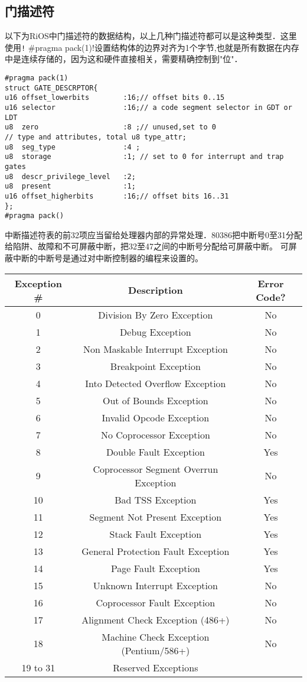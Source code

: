 \subsection{门描述符}
以下为RiOS中门描述符的数据结构，以上几种门描述符都可以是这种类型．这里使用\texttt!
#pragma pack(1)!设置结构体的边界对齐为1个字节,也就是所有数据在内存中是连续存储的，因为这和硬件直接相关，需要精确控制到"位"．
\begin{verbatim}
#pragma pack(1)
struct GATE_DESCRPTOR{
u16 offset_lowerbits        :16;// offset bits 0..15
u16 selector                :16;// a code segment selector in GDT or LDT
u8  zero                    :8 ;// unused,set to 0
// type and attributes, total u8 type_attr;
u8  seg_type                :4 ;
u8  storage                 :1; // set to 0 for interrupt and trap gates 
u8  descr_privilege_level   :2;
u8  present                 :1;
u16 offset_higherbits       :16;// offset bits 16..31	
};
#pragma pack()
\end{verbatim}

中断描述符表的前32项应当留给处理器内部的异常处理．80386把中断号0至31分配
给陷阱、故障和不可屏蔽中断，把32至47之间的中断号分配给可屏蔽中断。
可屏蔽中断的中断号是通过对中断控制器的编程来设置的。

\begin{tabular}{|c|c|c|}%
    \toprule
    Exception \# & Description & Error Code?\tabularnewline
    \midrule
    0 & Division By Zero Exception & No\tabularnewline
    1 & Debug Exception & No\tabularnewline
    2 & Non Maskable Interrupt Exception & No\tabularnewline
    3 & Breakpoint Exception & No\tabularnewline
    4 & Into Detected Overflow Exception & No\tabularnewline
    5 & Out of Bounds Exception & No\tabularnewline
    6 & Invalid Opcode Exception & No\tabularnewline
    7 & No Coprocessor Exception & No\tabularnewline
    8 & Double Fault Exception & Yes\tabularnewline
    9 & Coprocessor Segment Overrun Exception & No\tabularnewline
    10 & Bad TSS Exception & Yes\tabularnewline
    11 & Segment Not Present Exception & Yes\tabularnewline
    12 & Stack Fault Exception & Yes\tabularnewline
    13 & General Protection Fault Exception & Yes\tabularnewline
    14 & Page Fault Exception & Yes\tabularnewline
    15 & Unknown Interrupt Exception & No\tabularnewline
    16 & Coprocessor Fault Exception & No\tabularnewline
    17 & Alignment Check Exception (486+) & No\tabularnewline
    18 & Machine Check Exception (Pentium/586+) & No\tabularnewline
    19 to 31 & Reserved Exceptions &\tabularnewline
    \bottomrule
\end{tabular}

